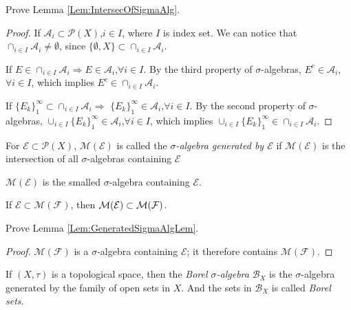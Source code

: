 \begin{exc}
    Prove Lemma \ref{Lem:IntersecOfSigmaAlg}.
\end{exc}
\begin{proof}
    If $\mathcal{A}_{i}\subset\mathcal{P}(X)$,$i\in I$, 
    where $I$ is index set. We can notice that $\cap_{i \in I}\mathcal{A}_{i}\neq\emptyset$,
    since $\{\emptyset,X\}\subset\cap_{i \in I}\mathcal{A}_{i}$.
    
    If $E\in\cap_{i\in I}\mathcal{A}_{i}$$\Rightarrow$$E\in\mathcal{A}_{i}$,$\forall i\in I$.
    By the third property of $\sigma$-algebras, $E^c\in\mathcal{A}_{i}$,$\forall i\in I$,
    which implies $E^c\in\cap_{i \in I}\mathcal{A}_{i}$.
    
    If $\{E_{k}\}_1^{\infty}\subset\cap_{i \in I}\mathcal{A}_{i}$$\Rightarrow$
    $\{E_{k}\}_1^{\infty}\in\mathcal{A}_{i}$,$\forall i\in I$.
    By the second property of $\sigma$-algebras, 
    $\cup_{i\in I}\{E_{k}\}_1^{\infty}\in\mathcal{A}_{i}$,$\forall i\in I$,
    which implies $\cup_{i\in I}\{E_{k}\}_1^{\infty}\in\cap_{i \in I}\mathcal{A}_{i}$.
\end{proof}
\begin{defn}
\label{Defn:GeneratedSigmaAlg}
For $\mathcal{E}\subset\mathcal{P}(X)$, $\mathcal{M}(\mathcal{E})$ 
is called the \textit{$\sigma$-algebra generated by $\mathcal{E}$} 
if $\mathcal{M}(\mathcal{E})$ is the intersection of all $\sigma$-algebras 
containing $\mathcal{E}$
\end{defn}
\begin{rem}
    $\mathcal{M}(\mathcal{E})$ is the smalled $\sigma$-algebra 
    containing $\mathcal{E}$.
\end{rem}
\begin{lem}
    \label{Lem:GeneratedSigmaAlgLem}
    If $\mathcal{E}\subset\mathcal{M}(\mathcal{F})$, 
    then $\mathcal{M}(\mathcal{E})\subset\mathcal{M}(\mathcal{F})$.
\end{lem}
\begin{exc}
    Prove Lemma \ref{Lem:GeneratedSigmaAlgLem}.
\end{exc}
\begin{proof}
    $\mathcal{M}(\mathcal{F})$ is a $\sigma$-algebra containing $\mathcal{E}$; it therefore contains $\mathcal{M}(\mathcal{F})$.
\end{proof}
\begin{defn}
    If $(X,\tau)$ is a topological space, then 
    the \textit{Borel $\sigma$-algebra} $\mathcal{B}_{X}$ is the 
    $\sigma$-algebra generated by the family of open sets 
    in $X$. 
    And the sets in $\mathcal{B}_{X}$ is called \textit{Borel sets}.
\end{defn}
